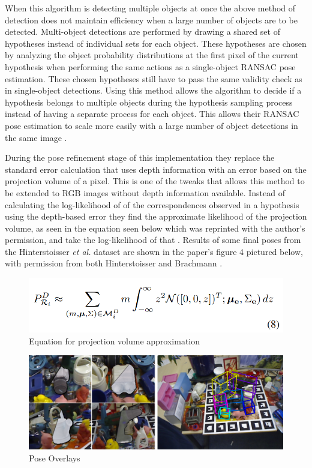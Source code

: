 \documentclass[12pt]{article}
\begin{document}
When this algorithm is detecting multiple objects at once the above
method of detection does not maintain efficiency when a large number of
objects are to be detected. Multi-object detections are performed by
drawing a shared set of hypotheses instead of individual sets for each
object. These hypotheses are chosen by analyzing the object probability
distributions at the first pixel of the current hypothesis when
performing the same actions as a single-object RANSAC pose estimation.
These chosen hypotheses still have to pass the same validity check as in
single-object detections. Using this method allows the algorithm to
decide if a hypothesis belongs to multiple objects during the hypothesis
sampling process instead of having a separate process for each object.
This allows their RANSAC pose estimation to scale more easily with a
large number of object detections in the same image
\autocite{brachmann}.

During the pose refinement stage of this implementation they replace the
standard error calculation that uses depth information with an error
based on the projection volume of a pixel. This is one of the tweaks
that allows this method to be extended to RGB images without depth
information available. Instead of calculating the log-likelihood of of
the correspondences observed in a hypothesis using the depth-based error
they find the approximate likelihood of the projection volume, as seen
in the equation seen below which was reprinted with the author's
permission, and take the log-likelihood of that \autocite{brachmann}.
Results of some final poses from the Hinterstoisser \emph{et al.}
dataset are shown in the paper's figure 4 pictured below, with
permission from both Hinterstoisser and Brachmann
\autocites{brachmann}{hinterstoisser}.

\begin{figure}
\centering
\includegraphics{Pictures/eq8.png}
\caption{Equation for projection volume approximation}
\end{figure}

\begin{figure}
\centering
\includegraphics{Pictures/figure4.png}
\caption{Pose Overlays}
\end{figure}
\end{document}
